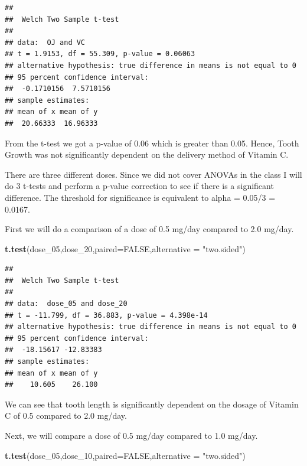\documentclass[
]{article}
\newenvironment{Shaded}{\begin{snugshade}}{\end{snugshade}}
\newcommand{\DataTypeTok}[1]{\textcolor[rgb]{0.13,0.29,0.53}{#1}}
\newcommand{\DecValTok}[1]{\textcolor[rgb]{0.00,0.00,0.81}{#1}}
\newcommand{\KeywordTok}[1]{\textcolor[rgb]{0.13,0.29,0.53}{\textbf{#1}}}
\newcommand{\NormalTok}[1]{#1}
\newcommand{\OtherTok}[1]{\textcolor[rgb]{0.56,0.35,0.01}{#1}}
\newcommand{\StringTok}[1]{\textcolor[rgb]{0.31,0.60,0.02}{#1}}
\begin{document}
\begin{verbatim}
## 
##  Welch Two Sample t-test
## 
## data:  OJ and VC
## t = 1.9153, df = 55.309, p-value = 0.06063
## alternative hypothesis: true difference in means is not equal to 0
## 95 percent confidence interval:
##  -0.1710156  7.5710156
## sample estimates:
## mean of x mean of y 
##  20.66333  16.96333
\end{verbatim}

From the t-test we got a p-value of 0.06 which is greater than 0.05.
Hence, Tooth Growth was not significantly dependent on the delivery
method of Vitamin C.

There are three different doses. Since we did not cover ANOVAs in the
class I will do 3 t-tests and perform a p-value correction to see if
there is a significant difference. The threshold for significance is
equivalent to alpha = 0.05/3 = 0.0167.

First we will do a comparison of a dose of 0.5 mg/day compared to 2.0
mg/day.

\begin{Shaded}
\begin{Highlighting}[]
\KeywordTok{t.test}\NormalTok{(dose\_}\DecValTok{05}\NormalTok{,dose\_}\DecValTok{20}\NormalTok{,}\DataTypeTok{paired=}\OtherTok{FALSE}\NormalTok{,}\DataTypeTok{alternative =} \StringTok{"two.sided"}\NormalTok{)}
\end{Highlighting}
\end{Shaded}

\begin{verbatim}
## 
##  Welch Two Sample t-test
## 
## data:  dose_05 and dose_20
## t = -11.799, df = 36.883, p-value = 4.398e-14
## alternative hypothesis: true difference in means is not equal to 0
## 95 percent confidence interval:
##  -18.15617 -12.83383
## sample estimates:
## mean of x mean of y 
##    10.605    26.100
\end{verbatim}

We can see that tooth length is significantly dependent on the dosage of
Vitamin C of 0.5 compared to 2.0 mg/day.

Next, we will compare a dose of 0.5 mg/day compared to 1.0 mg/day.

\begin{Shaded}
\begin{Highlighting}[]
\KeywordTok{t.test}\NormalTok{(dose\_}\DecValTok{05}\NormalTok{,dose\_}\DecValTok{10}\NormalTok{,}\DataTypeTok{paired=}\OtherTok{FALSE}\NormalTok{,}\DataTypeTok{alternative =} \StringTok{"two.sided"}\NormalTok{)}
\end{Highlighting}
\end{Shaded}
\end{document}
